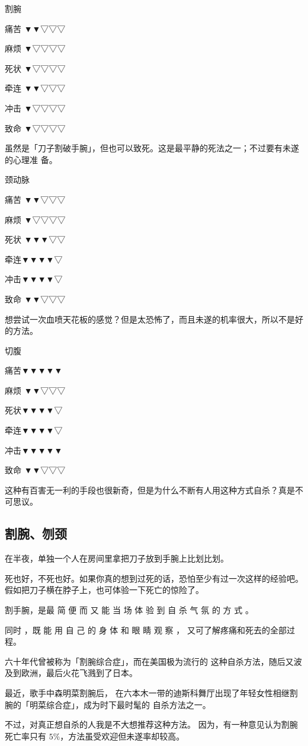 \documentclass[UTF8]{ctexart}
\begin{document}
割腕

痛苦 ▼▼▽▽▽

麻烦 ▼▽▽▽▽

死状 ▼▽▽▽▽

牵连 ▼▼▽▽▽

冲击 ▼▽▽▽▽

致命 ▼▽▽▽▽

虽然是「刀子割破手腕」，但也可以致死。这是最平静的死法之一；不过要有未遂的心理准
备。

颈动脉

痛苦 ▼▼▽▽▽

麻烦 ▼▽▽▽▽

死状 ▼▼▼▽▽

牵连▼▼▼▼▽

冲击▼▼▼▼▽

致命 ▼▼▽▽▽

想尝试一次血喷天花板的感觉？但是太恐怖了，而且未遂的机率很大，所以不是好的方法。

切腹

痛苦▼▼▼▼▼

麻烦 ▼▼▽▽▽

死状▼▼▼▼▽

牵连▼▼▼▼▽

冲击▼▼▼▼▼

致命 ▼▼▽▽▽

这种有百害无一利的手段也很新奇，但是为什么不断有人用这种方式自杀？真是不可思议。

\subsection*{割腕、刎颈}

在半夜，单独一个人在房间里拿把刀子放到手腕上比划比划。

死也好，不死也好。如果你真的想到过死的话，恐怕至少有过一次这样的经验吧。假如把刀子横在脖子上，也可体验一下死亡的惊险了。

割手腕，是最 简 便 而 又 能 当 场 体 验 到 自 杀 气 氛 的 方 式 。

同时 ，既 能 用 自 己 的 身 体 和 眼 睛 观 察 ， 又可了解疼痛和死去的全部过程。

六十年代曾被称为「割腕综合症」，而在美国极为流行的
这种自杀方法，随后又波及到欧洲，最后火花飞溅到了日本。

最近，歌手中森明菜割腕后， 在六本木一带的迪斯科舞厅出现了年轻女性相继割腕的「明菜综合症」，成为时下最时髦的 自杀方法之一。

不过，对真正想自杀的人我是不大想推荐这种方法。
因为，有一种意见认为割腕死亡率只有 $5\%$，方法虽受欢迎但未遂率却较高。
\end{document}
